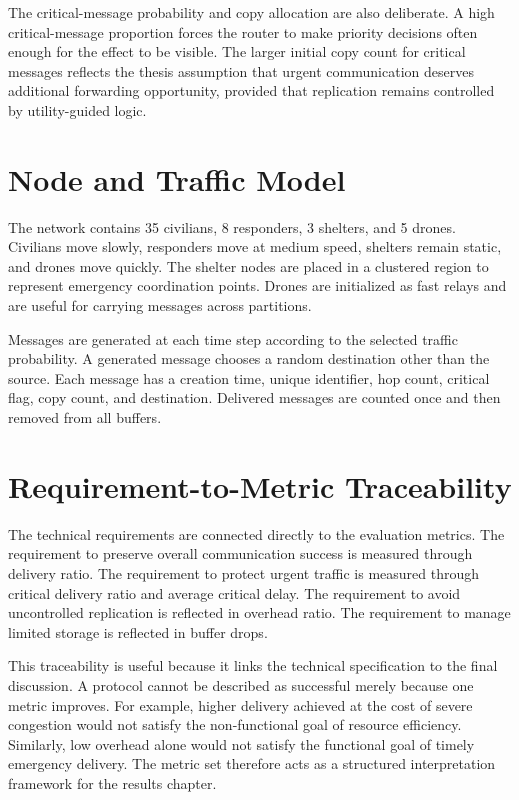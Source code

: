 The critical-message probability and copy allocation are also deliberate. A high critical-message proportion forces the router to make priority decisions often enough for the effect to be visible. The larger initial copy count for critical messages reflects the thesis assumption that urgent communication deserves additional forwarding opportunity, provided that replication remains controlled by utility-guided logic.

\section{Node and Traffic Model}
The network contains 35 civilians, 8 responders, 3 shelters, and 5 drones. Civilians move slowly, responders move at medium speed, shelters remain static, and drones move quickly. The shelter nodes are placed in a clustered region to represent emergency coordination points. Drones are initialized as fast relays and are useful for carrying messages across partitions.

Messages are generated at each time step according to the selected traffic probability. A generated message chooses a random destination other than the source. Each message has a creation time, unique identifier, hop count, critical flag, copy count, and destination. Delivered messages are counted once and then removed from all buffers.

\section{Requirement-to-Metric Traceability}
The technical requirements are connected directly to the evaluation metrics. The requirement to preserve overall communication success is measured through delivery ratio. The requirement to protect urgent traffic is measured through critical delivery ratio and average critical delay. The requirement to avoid uncontrolled replication is reflected in overhead ratio. The requirement to manage limited storage is reflected in buffer drops.

This traceability is useful because it links the technical specification to the final discussion. A protocol cannot be described as successful merely because one metric improves. For example, higher delivery achieved at the cost of severe congestion would not satisfy the non-functional goal of resource efficiency. Similarly, low overhead alone would not satisfy the functional goal of timely emergency delivery. The metric set therefore acts as a structured interpretation framework for the results chapter.

